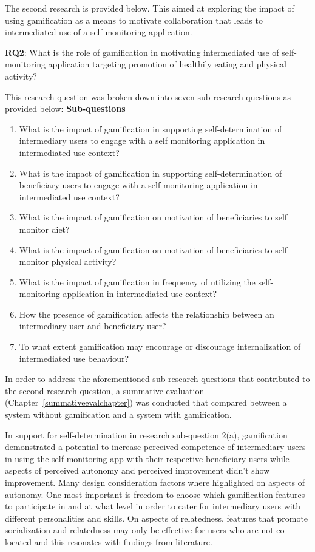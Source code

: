 The second research is provided below. This aimed at exploring the impact of using gamification as a means to motivate collaboration that leads to intermediated use of a self-monitoring application.

\textbf{RQ2}: What is the role of gamification in motivating intermediated use of self-monitoring application targeting promotion of healthily eating and physical activity?

This research question was broken down into seven sub-research questions as provided below:
\textbf{Sub-questions}
\begin{enumerate}[label=\alph*.]
\item What is the impact of gamification in supporting self-determination of intermediary users to engage with a self monitoring application in intermediated use context?
\item What is the impact of gamification in supporting self-determination of beneficiary users to engage with a self-monitoring application in intermediated use context?
\item What is the impact of gamification on motivation of beneficiaries to self monitor diet?
\item What is the impact of gamification on motivation of beneficiaries to self monitor physical activity?
\item What is the impact of gamification in frequency of utilizing the self-monitoring application in intermediated use context?
\item How the presence of gamification affects the relationship between an intermediary user and beneficiary user?
\item To what extent gamification may encourage or discourage internalization of intermediated use behaviour?

\end{enumerate} 

In order to address the aforementioned sub-research questions that contributed to the second research question, a summative evaluation (Chapter~\ref{summativeevalchapter}) was conducted that compared between a system without gamification and a system with gamification. 

In support for self-determination in research sub-question 2(a), gamification demonstrated a potential to increase perceived competence of intermediary users in using the self-monitoring app with their respective beneficiary users while aspects of perceived autonomy and perceived improvement didn't show improvement. Many design consideration factors where highlighted on aspects of autonomy. One most important is freedom to choose which gamification features to participate in and at what level in order to cater for intermediary users with different personalities and skills. On aspects of relatedness, features that promote socialization and relatedness may only be effective for users who are not co-located and this resonates with findings from literature. 

